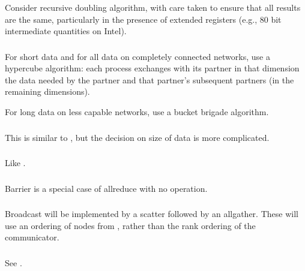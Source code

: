 \documentclass{article}
\begin{document}
\subsubsection{}
Consider recursive doubling algorithm, with care taken to ensure that all
results are the same, particularly in the presence of extended registers
(e.g., 80 bit intermediate quantities on Intel).

\subsubsection{}
For short data and for all data on completely connected networks, use a
hypercube algorithm: each process exchanges with its partner in that dimension
the data needed by the partner and that partner's subsequent partners (in the
remaining dimensions).

For long data on less capable networks, use a bucket brigade algorithm.

\subsubsection{}
This is similar to , but the decision on size of data is
more complicated.  

\subsubsection{}
Like .

\subsubsection{}
Barrier is a special case of allreduce with no operation.

\subsubsection{}
Broadcast will be implemented by a scatter followed by an allgather.  These
will use an ordering of nodes from , rather than
the rank ordering of the communicator.

\subsubsection{}
See .
\end{document}
